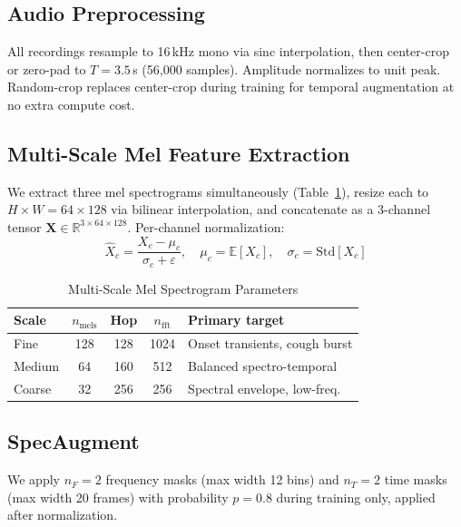 \documentclass[journal]{IEEEtran}
\newcommand{\R}{\mathbb{R}}
\begin{document}
\subsection{Audio Preprocessing}

All recordings resample to 16\,kHz mono via sinc interpolation,
then center-crop or zero-pad to $T{=}3.5$\,s (56,000 samples).
Amplitude normalizes to unit peak. Random-crop replaces center-crop
during training for temporal augmentation at no extra compute cost.

\subsection{Multi-Scale Mel Feature Extraction}
\label{sec:mel}

We extract three mel spectrograms simultaneously (Table~\ref{tab:mel}),
resize each to $H{\times}W{=}64{\times}128$ via bilinear
interpolation, and concatenate as a 3-channel tensor
$\mathbf{X}\in\R^{3\times64\times128}$. Per-channel normalization:
\begin{equation}
\hat{X}_c = \frac{X_c - \mu_c}{\sigma_c + \varepsilon}, \quad
\mu_c = \mathbb{E}[X_c],\quad \sigma_c = \mathrm{Std}[X_c]
\label{eq:norm}
\end{equation}

\begin{table}[!t]
\renewcommand{\arraystretch}{1.3}
\caption{Multi-Scale Mel Spectrogram Parameters}
\label{tab:mel}
\centering
\begin{tabular}{lcccl}
\toprule
\textbf{Scale} & $n_\text{mels}$ & \textbf{Hop} & $n_\text{fft}$
               & \textbf{Primary target} \\
\midrule
Fine   & 128 & 128 & 1024 & Onset transients, cough burst \\
Medium & 64  & 160 & 512  & Balanced spectro-temporal      \\
Coarse & 32  & 256 & 256  & Spectral envelope, low-freq.   \\
\bottomrule
\end{tabular}
\end{table}

\subsection{SpecAugment}
\label{sec:specaug}

We apply $n_F{=}2$ frequency masks (max width 12 bins) and $n_T{=}2$
time masks (max width 20 frames) with probability $p{=}0.8$ during
training only, applied after normalization.
\end{document}
